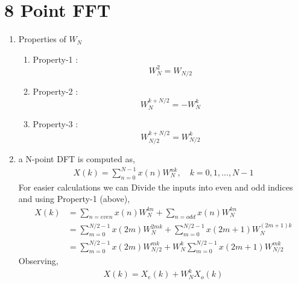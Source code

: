 \documentclass[journal,12pt,twocolumn]{IEEEtran}
\renewcommand\thesection{\arabic{section}}
\begin{document}
\section{8 Point FFT}
\begin{enumerate}[label=\thesection.\arabic*.,ref=\thesection.\theenumi]
\item Properties of $W_{N}$
\begin{enumerate}
\item Property-1 : \[ W^{2}_{N} =  W_{N/2} \]  
\item Property-2 : \[ W^{k+N/2}_{N} = - W^{k}_{N} \]
\item Property-3 : \[ W^{k+N/2}_{N/2} = W^{k}_{N/2} \]
\end{enumerate}
\item  a N-point DFT is computed as,
    \begin{align}
        X(k) = \sum_{n=0}^{N-1} x(n)W^{nk}_{N}, \quad k=0,1, \ldots, N-1
    \end{align}
For easier calculations we can Divide the inputs into even and odd indices and using Property-1 (above),
    \begin{align}
       X(k) &= \sum_{n=even} x(n)W^{kn}_{N} + \sum_{n=odd} x(n)W^{kn}_{N} \\
       &= \sum_{m=0}^{N/2 -1} x(2m)W^{2mk}_{N} + \sum_{m=0}^{N/2 -1} x(2m+1)W^{(2m+1)k}_{N} \\
       &= \sum_{m=0}^{N/2 -1} x(2m)W^{mk}_{N/2} + W^{k}_{N} \sum_{m=0}^{N/2 -1} x(2m+1)W^{mk}_{N/2} 
    \end{align}
Observing,
\begin{align}
X(k) = {X_{e}(k)}+ W_{N}^k{X_{o}(k)}
\label{eq:equation3}
\end{align}
    

\end{enumerate}
\end{document}
